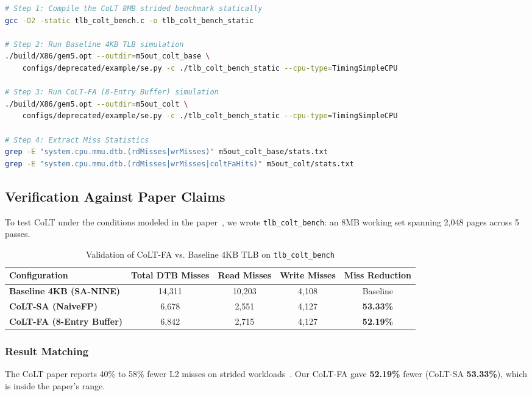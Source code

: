 \begin{lstlisting}[float=H,language=bash,caption={Compilation and Execution Commands for CoLT-FA Experiments in \texttt{gem5}},label={lst:cmd_colt}]
# Step 1: Compile the CoLT 8MB strided benchmark statically
gcc -O2 -static tlb_colt_bench.c -o tlb_colt_bench_static

# Step 2: Run Baseline 4KB TLB simulation
./build/X86/gem5.opt --outdir=m5out_colt_base \
    configs/deprecated/example/se.py -c ./tlb_colt_bench_static --cpu-type=TimingSimpleCPU

# Step 3: Run CoLT-FA (8-Entry Buffer) simulation
./build/X86/gem5.opt --outdir=m5out_colt \
    configs/deprecated/example/se.py -c ./tlb_colt_bench_static --cpu-type=TimingSimpleCPU

# Step 4: Extract Miss Statistics
grep -E "system.cpu.mmu.dtb.(rdMisses|wrMisses)" m5out_colt_base/stats.txt
grep -E "system.cpu.mmu.dtb.(rdMisses|wrMisses|coltFaHits)" m5out_colt/stats.txt
\end{lstlisting}

\subsection{Verification Against Paper Claims}
To test CoLT under the conditions modeled in the paper~\cite{pham2012colt}, we wrote \texttt{tlb\_colt\_bench}: an 8MB working set spanning 2,048 pages across 5 passes.

\begin{table}[H]
\centering
\small
\caption{Validation of CoLT-FA vs. Baseline 4KB TLB on \texttt{tlb\_colt\_bench}}
\label{tab:colt_results}
\begin{tabularx}{\textwidth}{lcccc}
\toprule
\textbf{Configuration} & \textbf{Total DTB Misses} & \textbf{Read Misses} & \textbf{Write Misses} & \textbf{Miss Reduction} \\
\midrule
\textbf{Baseline 4KB (SA-NINE)} & 14,311 & 10,203 & 4,108 & Baseline \\
\textbf{CoLT-SA (NaiveFP)} & 6,678 & 2,551 & 4,127 & \textbf{53.33\%} \\
\textbf{CoLT-FA (8-Entry Buffer)} & 6,842 & 2,715 & 4,127 & \textbf{52.19\%} \\
\bottomrule
\end{tabularx}
\end{table}

\subsubsection{Result Matching}
The CoLT paper reports 40\% to 58\% fewer L2 misses on strided workloads~\cite{pham2012colt}. Our CoLT-FA gave \textbf{52.19\%} fewer (CoLT-SA \textbf{53.33\%}), which is inside the paper's range.

